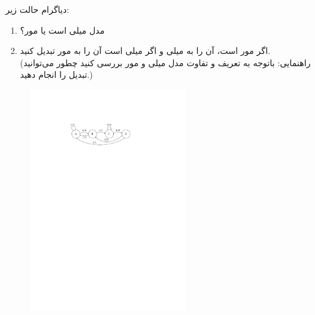 دیاگرام حالت زیر:

\begin{enumerate}
	\item 
	مدل میلی است یا مور؟
	
	\item 
	اگر مور است، آن را به میلی و اگر میلی است آن را به مور تبدیل کنید.\\
	(راهنمایی: باتوجه به تعریف و تفاوت مدل میلی و مور بررسی کنید چطور می‌توانید تبدیل را انجام دهید.)
\end{enumerate}

\begin{figure}[h]
	\centering
	\includegraphics[width=0.6\textwidth]{fig/Q_basic9.pdf}
	\label{fig:Q_basic_9}
\end{figure}